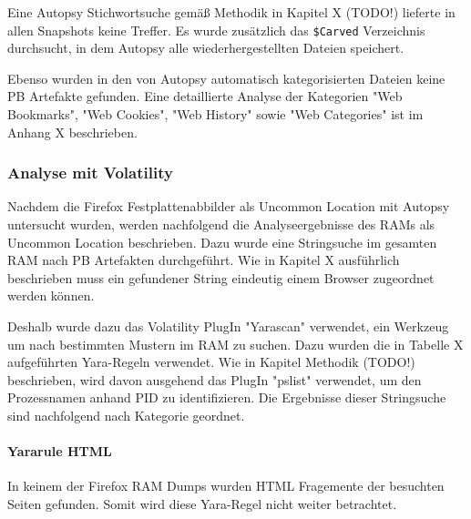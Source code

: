 Eine Autopsy Stichwortsuche gemäß Methodik in Kapitel X (TODO!) lieferte in allen Snapshots keine Treffer. Es wurde zusätzlich das \texttt{\$Carved} Verzeichnis durchsucht, in dem Autopsy alle wiederhergestellten Dateien speichert.

Ebenso wurden in den von Autopsy automatisch kategorisierten Dateien keine PB Artefakte gefunden. Eine detaillierte Analyse der Kategorien "Web Bookmarks", "Web Cookies", "Web History" sowie "Web Categories" ist im Anhang X beschrieben.

\subsubsection*{Analyse mit Volatility}
Nachdem die Firefox Festplattenabbilder als Uncommon Location mit Autopsy untersucht wurden, werden nachfolgend die Analyseergebnisse des RAMs als Uncommon Location beschrieben. 
Dazu wurde eine Stringsuche im gesamten RAM nach PB Artefakten durchgeführt.
Wie in Kapitel X ausführlich beschrieben muss ein gefundener String eindeutig einem Browser zugeordnet werden können. 

Deshalb wurde dazu das Volatility PlugIn "Yarascan" verwendet, ein Werkzeug um nach bestimmten Mustern im RAM zu suchen. Dazu wurden die in Tabelle X aufgeführten Yara-Regeln verwendet.
Wie in Kapitel Methodik (TODO!) beschrieben, wird davon ausgehend das PlugIn "pslist" verwendet, um den Prozessnamen anhand PID zu identifizieren.
Die Ergebnisse dieser Stringsuche sind nachfolgend nach Kategorie geordnet.

\paragraph*{Yararule HTML}
In keinem der Firefox RAM Dumps wurden HTML Fragemente der besuchten Seiten gefunden. Somit wird diese Yara-Regel nicht weiter betrachtet.

